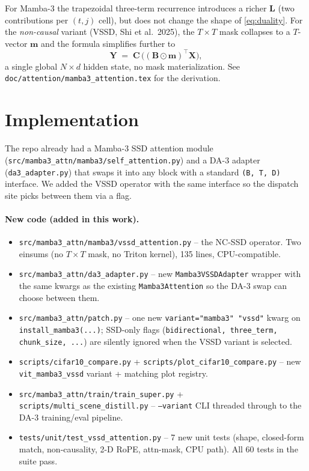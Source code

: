 \documentclass[11pt,a4paper]{article}
\begin{document}
For Mamba-3 the trapezoidal three-term recurrence introduces a richer
$\bm{L}$ (two contributions per $(t,j)$ cell), but does not change the
shape of \eqref{eq:duality}. For the \emph{non-causal} variant
(VSSD, Shi et al.\ 2025), the $T\times T$ mask collapses to a
$T$-vector $\bm{m}$ and the formula simplifies further to
\begin{equation}\label{eq:vssd}
  \bm{Y} \;=\; \bm{C}\,\bigl((\bm{B}\odot\bm{m})^\top\bm{X}\bigr),
\end{equation}
a single global $N\times d$ hidden state, no mask materialization.
See \texttt{doc/attention/mamba3\_attention.tex} for the derivation.

\section{Implementation}

The repo already had a Mamba-3 SSD attention module
(\texttt{src/mamba3\_attn/mamba3/self\_attention.py}) and a DA-3
adapter (\texttt{da3\_adapter.py}) that swaps it into any block with a
standard \texttt{(B, T, D)} interface. We added the VSSD operator with
the same interface so the dispatch site picks between them via a flag.

\paragraph{New code (added in this work).}
\begin{itemize}
  \item \texttt{src/mamba3\_attn/mamba3/vssd\_attention.py} -- the
        NC-SSD operator. Two einsums (no $T\times T$ mask, no
        Triton kernel), 135 lines, CPU-compatible.
  \item \texttt{src/mamba3\_attn/da3\_adapter.py} -- new
        \texttt{Mamba3VSSDAdapter} wrapper with the same kwargs as
        the existing \texttt{Mamba3Attention} so the DA-3 swap can
        choose between them.
  \item \texttt{src/mamba3\_attn/patch.py} -- one new
        \texttt{variant="mamba3" \textbar{} "vssd"} kwarg on
        \texttt{install\_mamba3(...)}; SSD-only flags
        (\texttt{bidirectional, three\_term, chunk\_size, ...}) are
        silently ignored when the VSSD variant is selected.
  \item \texttt{scripts/cifar10\_compare.py} +
        \texttt{scripts/plot\_cifar10\_compare.py} -- new
        \texttt{vit\_mamba3\_vssd} variant + matching plot registry.
  \item \texttt{src/mamba3\_attn/train/train\_super.py} +
        \texttt{scripts/multi\_scene\_distill.py} --
        \texttt{--variant} CLI threaded through to the DA-3
        training/eval pipeline.
  \item \texttt{tests/unit/test\_vssd\_attention.py} -- 7 new unit
        tests (shape, closed-form match, non-causality, 2-D RoPE,
        attn-mask, CPU path). All 60 tests in the suite pass.
\end{itemize}
\end{document}

